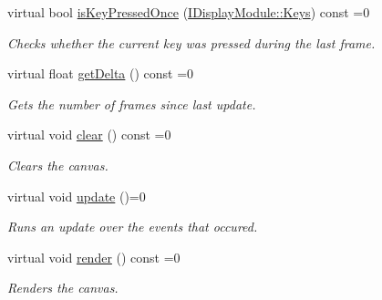 \begin{DoxyCompactItemize}
virtual bool \mbox{\hyperlink{classArcade_1_1Display_1_1IDisplayModule_ac347fc77c01e12c5ce23be99d357008d}{is\+Key\+Pressed\+Once}} (\mbox{\hyperlink{classArcade_1_1Display_1_1IDisplayModule_a8da3f6b309ca0581473ae8cc8789b619}{I\+Display\+Module\+::\+Keys}}) const =0
\begin{DoxyCompactList}\small\item\em Checks whether the current key was pressed during the last frame. \end{DoxyCompactList}\item 
virtual float \mbox{\hyperlink{classArcade_1_1Display_1_1IDisplayModule_aab078d82e6fdd32682553947c20226ac}{get\+Delta}} () const =0
\begin{DoxyCompactList}\small\item\em Gets the number of frames since last update. \end{DoxyCompactList}\item 
\mbox{\label{classArcade_1_1Display_1_1IDisplayModule_a4892b758c6710f45d4dcebe70f801639}} 
virtual void \mbox{\hyperlink{classArcade_1_1Display_1_1IDisplayModule_a4892b758c6710f45d4dcebe70f801639}{clear}} () const =0
\begin{DoxyCompactList}\small\item\em Clears the canvas. \end{DoxyCompactList}\item 
\mbox{\label{classArcade_1_1Display_1_1IDisplayModule_a1ca0c1052dccb78eb470e36e6f557e60}} 
virtual void \mbox{\hyperlink{classArcade_1_1Display_1_1IDisplayModule_a1ca0c1052dccb78eb470e36e6f557e60}{update}} ()=0
\begin{DoxyCompactList}\small\item\em Runs an update over the events that occured. \end{DoxyCompactList}\item 
\mbox{\label{classArcade_1_1Display_1_1IDisplayModule_a012f5804e7dc45515ef8e85e7ca8de5a}} 
virtual void \mbox{\hyperlink{classArcade_1_1Display_1_1IDisplayModule_a012f5804e7dc45515ef8e85e7ca8de5a}{render}} () const =0
\begin{DoxyCompactList}\small\item\em Renders the canvas. \end{DoxyCompactList}\item 

\end{DoxyCompactItemize}
